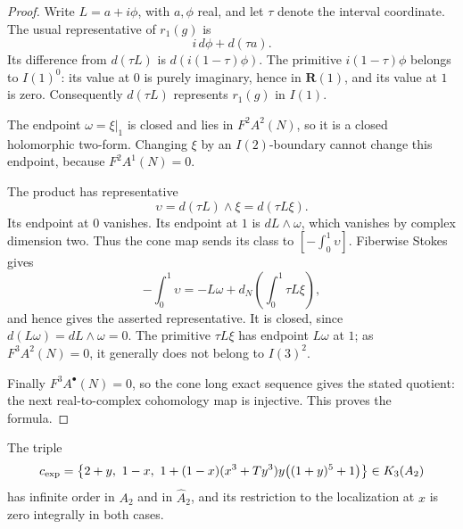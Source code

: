 \begin{proof}
Write $L=a+i\phi$, with $a,\phi$ real, and let $\tau$ denote the
interval coordinate. The usual representative of $r_1(g)$ is
\[
 i\,d\phi+d(\tau a).
\]
Its difference from $d(\tau L)$ is
$d(i(1-\tau)\phi)$. The primitive $i(1-\tau)\phi$ belongs to
$I(1)^0$: its value at $0$ is purely imaginary, hence in
$\mathbf R(1)$, and its value at $1$ is zero. Consequently
$d(\tau L)$ represents $r_1(g)$ in $I(1)$.

The endpoint $\omega=\xi|_1$ is closed and lies in $F^2A^2(N)$,
so it is a closed holomorphic two-form. Changing $\xi$ by an
$I(2)$-boundary cannot change this endpoint, because
$F^2A^1(N)=0$.

The product has representative
\[
 \upsilon=d(\tau L)\wedge\xi=d(\tau L\xi).
\]
Its endpoint at $0$ vanishes. Its endpoint at $1$ is
$dL\wedge\omega$, which vanishes by complex dimension two.
Thus the cone map sends its class to
$[-\int_0^1\upsilon]$. Fiberwise Stokes gives
\[
 -\int_0^1\upsilon
 =-L\omega+d_N\!\left(\int_0^1\tau L\xi\right),
\]
and hence gives the asserted representative. It is closed, since
$d(L\omega)=dL\wedge\omega=0$. The primitive $\tau L\xi$
has endpoint $L\omega$ at $1$; as $F^3A^2(N)=0$, it generally
does not belong to $I(3)^2$.

Finally $F^3A^\bullet(N)=0$, so the cone long exact sequence gives
the stated quotient: the next real-to-complex cohomology map is
injective. This proves the formula.
\end{proof}

\begin{proposition}
\label{d2ext:dimtwoExplicitTriple}
The triple
\begin{equation}\label{d2ext:eq-explicit-triple}
 c_{\rm exp}=\left\{2+y,\ 1-x,\
 1+(1-x)(x^3+Ty^3)y\bigl((1+y)^5+1\bigr)\right\}\in K_3(A_2)
\end{equation}
has infinite order in $A_2$ and in $\widehat A_2$, and its
restriction to the localization at $x$ is zero integrally in both cases.
\end{proposition}

